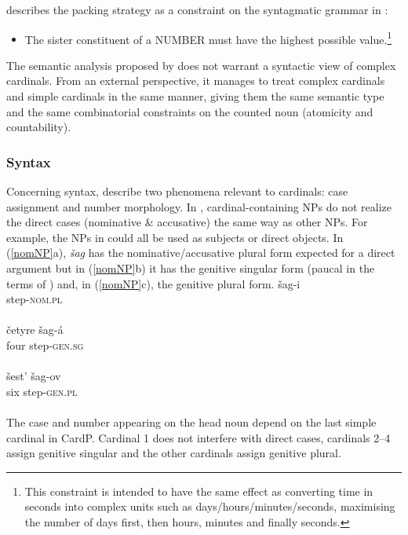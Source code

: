 \documentclass[output=paper]{langsci/langscibook}
\begin{document}
\citeauthor{Hurford07} describes the packing strategy as a constraint on the syntagmatic grammar in :
\begin{itemize}
\item The sister constituent of a NUMBER must have the highest possible value.\footnote{This constraint is intended to have the same effect as converting time in seconds into complex units such as days/hours/minutes/seconds, maximising the number of days first, then hours, minutes and finally seconds.}
\end{itemize}

The semantic analysis proposed by \citet{IM06} does not warrant a syntactic view of complex cardinals. From an external perspective, it manages to treat complex cardinals  and simple cardinals  in the same manner, giving them the same semantic type and the same combinatorial constraints on the counted noun (atomicity and countability).

\subsubsection{\textbf{Syntax}}
 \largerpage
Concerning syntax, \cite{IM06} describe two phenomena relevant to  cardinals: case assignment and number morphology. In , cardinal-contain\-ing NPs do not realize the direct cases (nominative \& accusative) the same way as other NPs. For example, the NPs in  could all be used as subjects or direct objects. In (\ref{nomNP}a), \emph{\v{s}ag}  has the nominative/accusative plural form expected for a direct argument but in (\ref{nomNP}b) it has the genitive singular form (paucal in the terms of \citeauthor{IM06}) and, in (\ref{nomNP}c), the genitive plural form.
\ea\label{nomNP}
	\ea\gll \v{s}ag-i \\ step-\textsc{nom.pl}\\ \\
	\ex\gll \v{c}etyre \v{s}ag-á \\ four step-\textsc{gen.sg}\\ \\       
	\ex\gll \v{s}est' \v{s}ag-ov \\ six step-\textsc{gen.pl}\\ \\
	\z
\z
The case and number appearing on the head noun depend on the last simple cardinal in CardP. Cardinal 1 does not interfere with direct cases, cardinals  2--4 assign genitive singular and the other cardinals  assign genitive plural.
\end{document}
